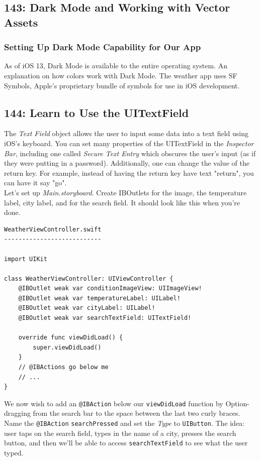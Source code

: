 \documentclass[12pt, letterpaper]{article}
\begin{document}
\subsection*{143: Dark Mode and Working with Vector Assets}

\subsubsection*{Setting Up Dark Mode Capability for Our App}

As of iOS 13, Dark Mode is available to the entire operating system. An explanation on how colors work with Dark Mode.
The weather app uses SF Symbols, Apple's proprietary bundle of symbols for use in iOS development. \\

\subsection*{144: Learn to Use the UITextField}

The \emph{Text Field} object allows the user to input some data into a text field using iOS's keyboard. You can set many
properties of the UITextField in the \emph{Inspector Bar}, including one called \emph{Secure Text Entry} which obscures
the user's input (as if they were putting in a password). Additionally, one can change the value of the return key.
For example, instead of having the return key have text "return", you can have it say "go".\\

Let's set up \emph{Main.storyboard}. Create IBOutlets for the image, the temperature label, city label, and for the search
field. It should look like this when you're done.

\begin{verbatim}
WeatherViewController.swift
---------------------------

import UIKit

class WeatherViewController: UIViewController {
    @IBOutlet weak var conditionImageView: UIImageView!
    @IBOutlet weak var temperatureLabel: UILabel!
    @IBOutlet weak var cityLabel: UILabel!
    @IBOutlet weak var searchTextField: UITextField!

    override func viewDidLoad() {
        super.viewDidLoad()
    }
    // @IBActions go below me
    // ...
}
\end{verbatim}

We now wish to add an \verb+@IBAction+ below our \verb+viewDidLoad+ function by Option-dragging from the search bar to the space
between the last two curly braces. Name the \verb+@IBAction+ \verb+searchPressed+ and set the \emph{Type} to \verb+UIButton+.
The idea: user taps on the search field, types in the name of a city, presses the search button, and then we'll be able
to access \verb+searchTextField+ to see what the user typed. \\
\end{document}
